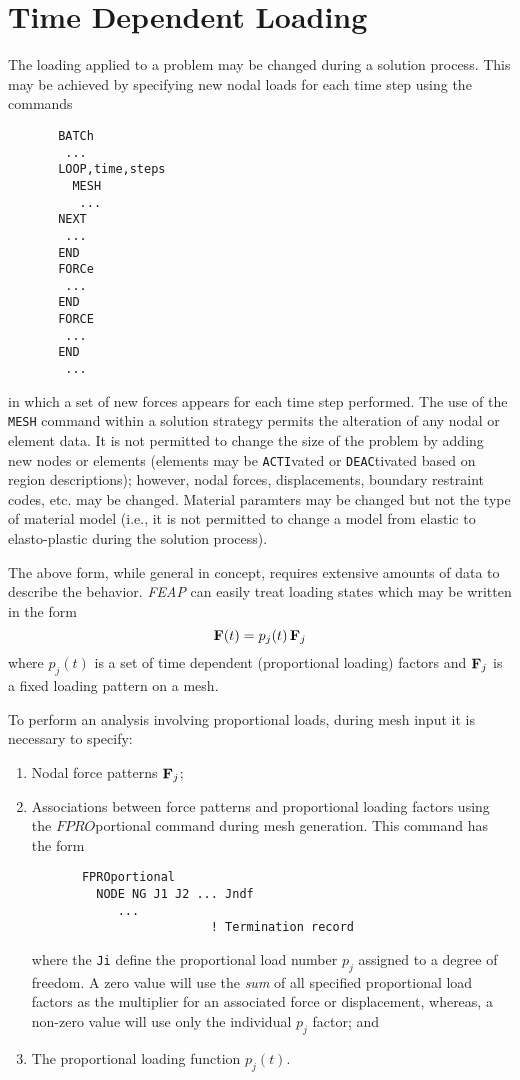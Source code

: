\section{Time Dependent Loading}

The loading applied to a problem may be changed during a solution
process.  This may be achieved by specifying new nodal loads for
each time step using the commands
\begin{verbatim}
       BATCh
        ...
       LOOP,time,steps
         MESH
          ...
       NEXT
        ...
       END
       FORCe
        ...
       END
       FORCE
        ...
       END
        ...
\end{verbatim}
in which a set of new forces appears for each time step performed.  The
use of the {\tt MESH} command within a solution strategy permits the alteration
of any nodal or element data.  It is not permitted to change the size of the
problem by adding new nodes or elements (elements may be {\tt ACTI}vated
or {\tt DEAC}tivated based on region descriptions); however, nodal forces,
displacements, boundary restraint codes, etc. may be changed.
Material paramters may be changed but not the type of material model (i.e.,
it is not permitted to change a model from elastic to elasto-plastic during
the solution process).

The above form, while general in concept, requires extensive amounts of
data to describe the behavior.  {\sl FEAP} can easily treat
loading states which may be written in the form
\begin{equation}
\mathbf{F}(t) = p_j(t) \, \mathbf{F}_j
\end{equation}
where $p_j(t)$ is a set of time dependent (proportional loading) factors
and $\mathbf{F}_j$ is a fixed loading pattern on a mesh.

To perform an analysis involving proportional loads, during mesh input
it is necessary to specify:
\begin{enumerate}
\item
Nodal force patterns $\mathbf{F}_j$;
\item
Associations between force patterns and proportional loading factors
using the $FPRO$\-por\-tion\-al command during mesh generation.  This command
has the form
\begin{verbatim}
       FPROportional
         NODE NG J1 J2 ... Jndf
            ...
                         ! Termination record
\end{verbatim}
where the {\tt Ji} define the proportional load number $p_j$ assigned to
a degree of freedom.  A zero value will use the {\it sum} of all specified
proportional load factors as the multiplier for an associated force or
displacement, whereas, a non-zero value will use only the individual $p_j$
factor; and
\item
The proportional loading function $p_j(t)$.
\end{enumerate}


